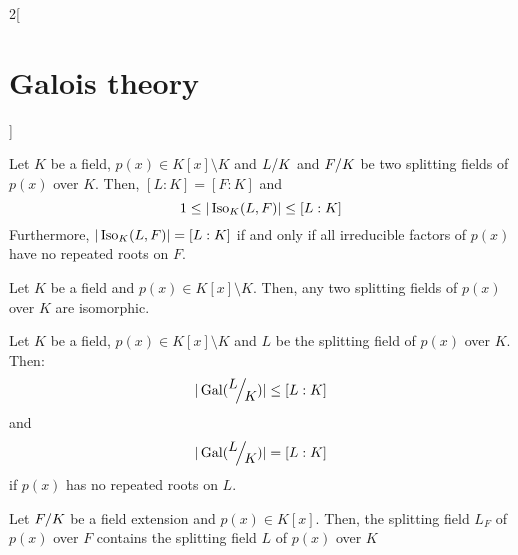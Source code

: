 \documentclass[../../../main.tex]{subfiles}
\begin{document}
\begin{multicols}{2}[\section{Galois theory}]
\begin{theorem}
  \end{theorem}
  \begin{theorem}
    Let $K$ be a field, $p(x)\in K[x]\setminus K$ and $\quot{L}{K}$ and $\quot{F}{K}$ be two splitting fields of $p(x)$ over $K$. Then, $[L:K]=[F:K]$ and $$1\leq|\operatorname{Iso}_K(L,F)|\leq [L:K]$$ Furthermore, $|\operatorname{Iso}_K(L,F)|=[L:K]$ if and only if all irreducible factors of $p(x)$ have no repeated roots on $F$.
  \end{theorem}
  \begin{corollary}
    Let $K$ be a field and $p(x)\in K[x]\setminus K$. Then, any two splitting fields of $p(x)$ over $K$ are isomorphic.
  \end{corollary}
  \begin{corollary}
    Let $K$ be a field, $p(x)\in K[x]\setminus K$ and $L$ be the splitting field of $p(x)$ over $K$. Then: $$|\Gal(\quot{L}{K})|\leq[L:K]$$ and $$|\Gal(\quot{L}{K})|=[L:K]$$ if $p(x)$ has no repeated roots on $L$.
  \end{corollary}
  \begin{corollary}
    Let $\quot{F}{K}$ be a field extension and $p(x)\in K[x]$. Then, the splitting field $L_F$ of $p(x)$ over $F$ contains the splitting field $L$ of $p(x)$ over $K$
  \end{corollary}

\end{multicols}
\end{document}
